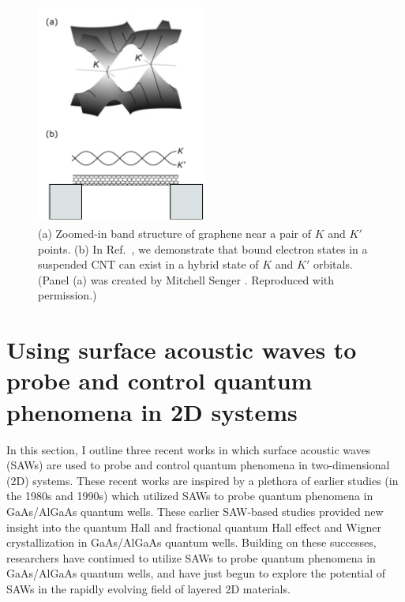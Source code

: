 \documentclass{beavtex_dub_edit}
\begin{document}
\begin{figure}
    \includegraphics[width = 0.5\textwidth]{CNT intro fig}
    \caption{(a) Zoomed-in band structure of graphene near a pair of $K$ and $K'$ points. (b) In Ref.\ \cite{berg_vernier_2024}, we demonstrate that bound electron states in a suspended CNT can exist in a hybrid state of $K$ and $K'$ orbitals. (Panel (a) was created by Mitchell Senger \cite{senger_optoelectronics_2021}. Reproduced with permission.)}
    \label{CNT intro fig}
\end{figure}

\section{Using surface acoustic waves to probe and control quantum phenomena in 2D systems} \label{using surface acoustic waves to probe and control quantum phenomena}

In this section, I outline three recent works in which surface acoustic waves (SAWs) are used to probe and control quantum phenomena in two-dimensional (2D) systems. These recent works are inspired by a plethora of earlier studies (in the 1980s and 1990s) which utilized SAWs to probe quantum phenomena in GaAs/AlGaAs quantum wells. These earlier SAW-based studies provided new insight into the quantum Hall and fractional quantum Hall effect \cite{wixforth_quantum_1986,esslinger_acoustoelectric_1992,esslinger_ultrasonic_1994,kukushkin_collective_2011,willett_experimental_1993} and Wigner crystallization \cite{paalanen_rf_1992} in GaAs/AlGaAs quantum wells. Building on these successes, researchers have continued to utilize SAWs to probe quantum phenomena in GaAs/AlGaAs quantum wells, and have just begun to explore the potential of SAWs in the rapidly evolving field of layered 2D materials.
\end{document}
